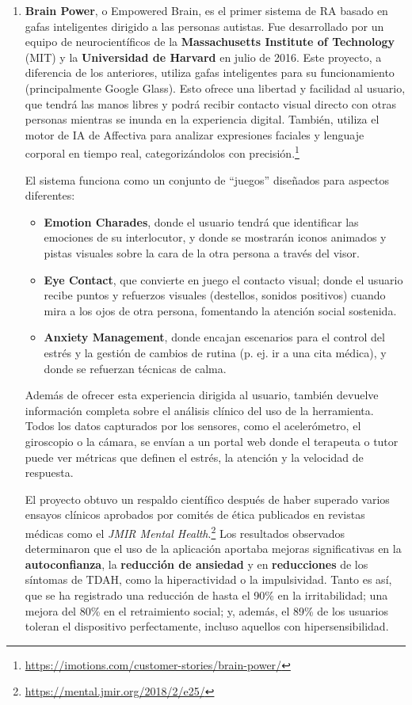 \documentclass[12pt,twoside,titlepage]{report}
\begin{document}
\begin{enumerate}[label=\textbf{\arabic*.}, leftmargin=1.5cm, itemsep=0.5em]
  \item \textbf{Brain Power}, o Empowered Brain, es el primer sistema de RA basado en gafas inteligentes dirigido a las personas autistas.
Fue desarrollado por un equipo de neurocientíficos de la \textbf{Massachusetts Institute of Technology} (MIT) y la \textbf{Universidad de Harvard} en julio de 2016.
Este proyecto, a diferencia de los anteriores, utiliza gafas inteligentes para su funcionamiento (principalmente Google Glass).
Esto ofrece una libertad y facilidad al usuario, que tendrá las manos libres y podrá recibir contacto visual directo con otras personas mientras se inunda en la experiencia digital.
También, utiliza el motor de IA de Affectiva para analizar expresiones faciales y lenguaje corporal en tiempo real, categorizándolos con precisión.\footnote{\url{https://imotions.com/customer-stories/brain-power/}}

  El sistema funciona como un conjunto de ``juegos'' diseñados para aspectos diferentes:
    \begin{itemize}[leftmargin=1.5cm, labelsep=0.5em, itemsep=0.5em]
        \item \textbf{Emotion Charades}, donde el usuario tendrá que identificar las emociones de su interlocutor, y donde se mostrarán iconos animados y pistas visuales sobre la cara de la otra persona a través del visor.
        \item \textbf{Eye Contact}, que convierte en juego el contacto visual; donde el usuario recibe puntos y refuerzos visuales (destellos, sonidos positivos) cuando mira a los ojos de otra persona, fomentando la atención social sostenida.
        \item \textbf{Anxiety Management}, donde encajan escenarios para el control del estrés y la gestión de cambios de rutina (p. ej. ir a una cita médica), y donde se refuerzan técnicas de calma.
    \end{itemize}

  Además de ofrecer esta experiencia dirigida al usuario, también devuelve información completa sobre el análisis clínico del uso de la herramienta.
Todos los datos capturados por los sensores, como el acelerómetro, el giroscopio o la cámara, se envían a un portal web donde el terapeuta o tutor puede ver métricas que definen el estrés, la atención y la velocidad de respuesta.

  El proyecto obtuvo un respaldo científico después de haber superado varios ensayos clínicos aprobados por comités de ética publicados en revistas médicas como el \textit{JMIR Mental Health}.\footnote{\url{https://mental.jmir.org/2018/2/e25/}} Los resultados observados determinaron que el uso de la aplicación aportaba mejoras significativas en la \textbf{autoconfianza}, la \textbf{reducción de ansiedad} y en \textbf{reducciones} de los síntomas de TDAH, como la hiperactividad o la impulsividad.
Tanto es así, que se ha registrado una reducción de hasta el 90\% en la irritabilidad; una mejora del 80\% en el retraimiento social; y, además, el 89\% de los usuarios toleran el dispositivo perfectamente, incluso aquellos con hipersensibilidad.

\end{enumerate}
\end{document}
